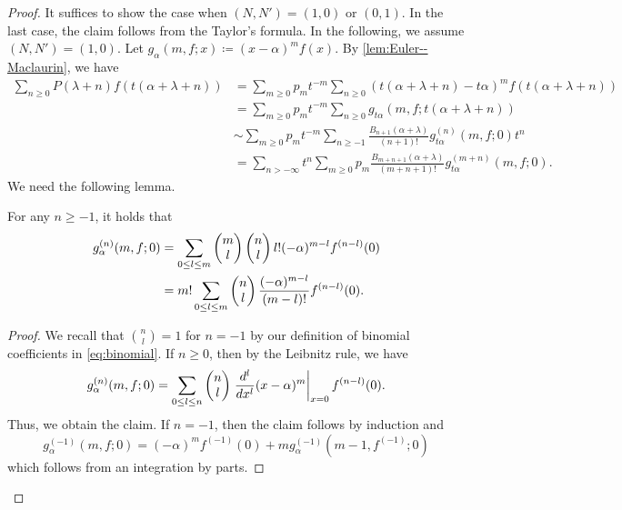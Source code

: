 \documentclass[11pt,a4paper,lualatex]{amsart}
\numberwithin{equation}{section} %
\begin{document}
\begin{proof}
	It suffices to show the case when $ (N, N') = (1, 0) $ or $ (0,1) $. 
	In the last case, the claim follows from the Taylor's formula.
	In the following, we assume $ (N, N') = (1, 0) $.
	Let $ g_\alpha(m, f; x) \coloneqq (x-\alpha)^m f(x) $.
	By \cref{lem:Euler--Maclaurin}, we have
	\begin{align}
		\sum_{n \ge 0} P(\lambda + n) f(t(\alpha + \lambda + n))
		&= \sum_{m \ge 0} p_m t^{-m} \sum_{n \ge 0} \left( t(\alpha + \lambda + n) - t \alpha \right)^m f(t(\alpha + \lambda + n)) \\
		&= \sum_{m \ge 0} p_m t^{-m} \sum_{n \ge 0} g_{t \alpha}(m, f; t(\alpha + \lambda + n)) \\
		&\sim \sum_{m \ge 0} p_m t^{-m} \sum_{n \ge -1} \frac{B_{n+1}(\alpha + \lambda)}{(n+1)!} g_{t \alpha}^{(n)} (m, f; 0) t^n \\
		&= \sum_{n > - \infty} t^n \sum_{m \ge 0} p_m \frac{B_{m+n+1}(\alpha + \lambda)}{(m+n+1)!} g_{t \alpha}^{(m+n)} (m, f; 0).
	\end{align}
	We need the following lemma.
	
	\begin{lem} \label{lem:g_diff}
		For any $ n \ge -1 $, it holds that
		\begin{align}
			g_{\alpha}^{(n)}(m, f; 0)
			&=
			\sum_{0 \le l \le m} \begin{pmatrix}m \\ l\end{pmatrix} \begin{pmatrix}n \\ l\end{pmatrix} l! (-\alpha)^{m - l} f^{(n-l)} (0) \\
			&=
			m! \sum_{0 \le l \le m} \begin{pmatrix}n \\ l\end{pmatrix} \frac{(-\alpha)^{m-l}}{(m-l)!} f^{(n-l)} (0).
		\end{align}
	\end{lem}
	
	\begin{proof}
		We recall that $ \binom{n}{l} = 1 $ for $ n=-1 $ by our definition of binomial coefficients in \cref{eq:binomial}.
		If $ n \ge 0 $, then by the Leibnitz rule, we have
		\[
		g_{\alpha}^{(n)} (m, f; 0)
		=
		\sum_{0 \le l \le n} \begin{pmatrix}n \\ l\end{pmatrix} \left. \frac{d^l}{dx^l} (x - \alpha)^m \right|_{x=0} f^{(n-l)}(0).
		\]
		Thus, we obtain the claim.
		If $ n = -1 $, then the claim follows by induction and
		\[
		g_{\alpha}^{(-1)} (m, f; 0)
		= (-\alpha)^m f^{(-1)} (0) + m g_{\alpha}^{(-1)} \left(m-1, f^{(-1)}; 0 \right)
		\]
		which follows from an integration by parts.
	\end{proof}
	

\end{proof}
\end{document}
